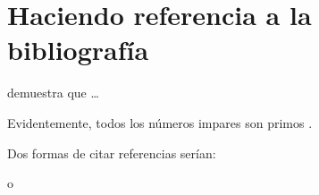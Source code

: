 \documentclass[12pt]{article}
\begin{document}
\newpage

\section{Haciendo referencia a la bibliografía}

\citet{Brooks1997Methodology}
demuestra que \ldots

Evidentemente, todos los números impares son primos \citep{Jacobson1999Towards}.

Dos formas de citar referencias serían:

\citep{Smith1990Enabling} o \citet{Smith1990Enabling}



\end{document}
